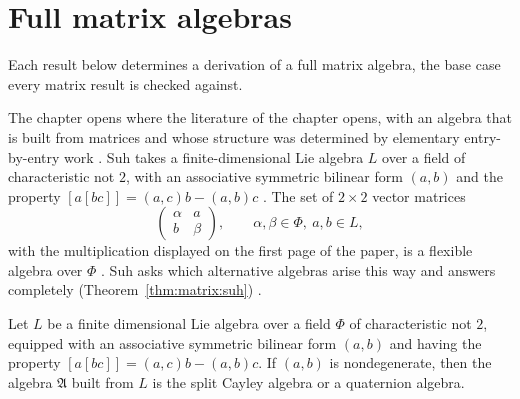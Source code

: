\section{Full matrix algebras}\label{sec:matrix-triangular:matrix}

Each result below determines a derivation of a full matrix algebra, the base case every matrix result is checked against.

The chapter opens where the literature of the chapter opens, with an algebra that is built
from matrices and whose structure was determined by elementary entry-by-entry
work \cite[p.~255]{Suh1969}. Suh takes a finite-dimensional Lie algebra $L$ over a field of
characteristic not $2$, with an associative symmetric bilinear form $(a,b)$ and
the property $[a[bc]]=(a,c)b-(a,b)c$ \cite[p.~255]{Suh1969}. The set of $2\times2$
vector matrices
\[
\begin{pmatrix} \alpha & a \\ b & \beta\end{pmatrix},
\qquad \alpha,\beta\in\Phi,\ a,b\in L,
\]
with the multiplication displayed on the first page of the paper, is a flexible
algebra over $\Phi$ \cite[p.~255]{Suh1969}. Suh asks which alternative algebras
arise this way and answers completely (Theorem~\ref{thm:matrix:suh}) \cite[p.~255]{Suh1969}.

\begin{theorem}\label{thm:matrix:suh}
Let $L$ be a finite dimensional Lie algebra over a field $\Phi$ of
characteristic not $2$, equipped with an associative symmetric bilinear form
$(a,b)$ and having the property $[a[bc]]=(a,c)b-(a,b)c$. If $(a,b)$ is
nondegenerate, then the algebra $\mathfrak{A}$ built from $L$ is the split
Cayley algebra or a quaternion algebra.
\end{theorem}

